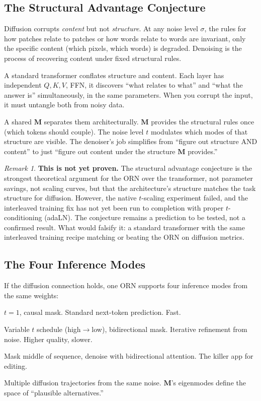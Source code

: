 \documentclass[11pt, a4paper]{article}
\newcommand{\M}{\mathbf{M}}
\theoremstyle{remark}
\newtheorem*{remark}{Remark}
\begin{document}
\subsection{The Structural Advantage Conjecture}

Diffusion corrupts \emph{content} but not \emph{structure}.
At any noise level $\sigma$, the rules for how patches relate to patches or how words relate to words are invariant, only the specific content (which pixels, which words) is degraded.
Denoising is the process of recovering content under fixed structural rules.

A standard transformer conflates structure and content.
Each layer has independent $Q, K, V$, FFN, it discovers ``what relates to what'' and ``what the answer is'' simultaneously, in the same parameters.
When you corrupt the input, it must untangle both from noisy data.

A shared $\M$ separates them architecturally.
$\M$ provides the structural rules once (which tokens should couple).
The noise level $t$ modulates which modes of that structure are visible.
The denoiser's job simplifies from ``figure out structure AND content'' to just ``figure out content under the structure $\M$ provides.''

\begin{remark}
\textbf{This is not yet proven.}
The structural advantage conjecture is the strongest theoretical argument for the ORN over the transformer, not parameter savings, not scaling curves, but that the architecture's structure matches the task structure for diffusion.
However, the native $t$-scaling experiment failed, and the interleaved training fix has not yet been run to completion with proper $t$-conditioning (adaLN).
The conjecture remains a prediction to be tested, not a confirmed result.
What would falsify it: a standard transformer with the same interleaved training recipe matching or beating the ORN on diffusion metrics.
\end{remark}

\subsection{The Four Inference Modes}

If the diffusion connection holds, one ORN supports four inference modes from the same weights:

\begin{description}[nosep]
\item[1. Autoregressive:] $t{=}1$, causal mask. Standard next-token prediction. Fast.
\item[2. Diffusion:] Variable $t$ schedule (high$\to$low), bidirectional mask. Iterative refinement from noise. Higher quality, slower.
\item[3. Infilling:] Mask middle of sequence, denoise with bidirectional attention. The killer app for editing.
\item[4. Brainstorming:] Multiple diffusion trajectories from the same noise. $\M$'s eigenmodes define the space of ``plausible alternatives.''
\end{description}
\end{document}
